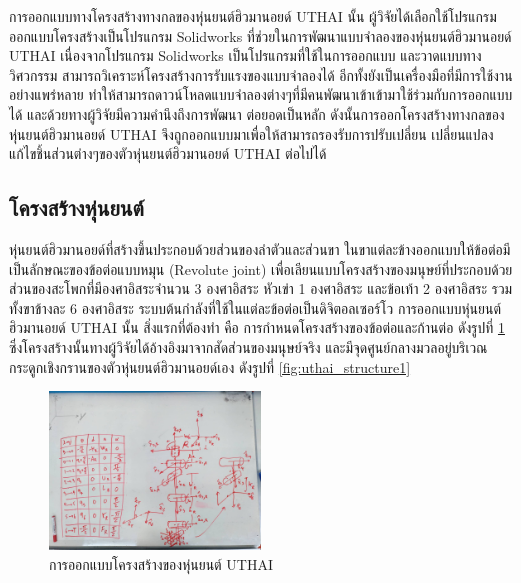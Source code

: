 การออกแบบทางโครงสร้างทางกลของหุ่นยนต์ฮิวมานอยด์ UTHAI นั้น ผู้วิจัยได้เลือกใช้โปรแกรมออกแบบโครงสร้างเป็นโปรแกรม Solidworks
ที่ช่วยในการพัฒนาแบบจำลองของหุ่นยนต์ฮิวมานอยด์ UTHAI
เนื่องจากโปรแกรม Solidworks เป็นโปรแกรมที่ใช้ในการออกแบบ และวาดแบบทางวิศวกรรม
สามารถวิเคราะห์โครงสร้างการรับแรงของแบบจำลองได้ อีกทั้งยังเป็นเครื่องมือที่มีการใช้งานอย่างแพร่หลาย
ทำให้สามารถดาวน์โหลดแบบจำลองต่างๆที่มีคนพัฒนาเข้าเข้ามาใช้ร่วมกับการออกแบบได้ 
และด้วยทางผู้วิจัยมีความคำนึงถึงการพัฒนา ต่อยอดเป็นหลัก ดังนั้นการออกโครงสร้างทางกลของหุ่นยนต์ฮิวมานอยด์ UTHAI
จึงถูกออกแบบมาเพื่อให้สามารถรองรับการปรับเปลี่ยน เปลี่ยนแปลง แก้ไขชิ้นส่วนต่างๆของตัวหุ่นยนต์ฮิวมานอยด์ UTHAI ต่อไปได้

\subsection{โครงสร้างหุ่นยนต์}
หุ่นยนต์ฮิวมานอยด์ที่สร้างขึ้นประกอบด้วยส่วนของลำตัวและส่วนขา ในขาแต่ละข้างออกแบบให้ข้อต่อมีเป็นลักษณะของข้อต่อแบบหมุน (Revolute joint)
เพื่อเลียนแบบโครงสร้างของมนุษย์ที่ประกอบด้วย ส่วนของสะโพกที่มีองศาอิสระจำนวน 3 องศาอิสระ หัวเข่า 1
องศาอิสระ และข้อเท้า 2 องศาอิสระ รวมทั้งขาข้างละ 6 องศาอิสระ ระบบต้นกำลังที่ใช้ในแต่ละข้อต่อเป็นดิจิตอลเซอร์โว
การออกแบบหุ่นยนต์ฮิวมานอยด์ UTHAI นั้น
สิ่งแรกที่ต้องทำ คือ การกำหนดโครงสร้างของข้อต่อและก้านต่อ ดังรูปที่ \ref{fig:uthai_design_structure}
ซึ่งโครงสร้างนั้นทางผู้วิจัยได้อ้างอิงมาจากสัดส่วนของมนุษย์จริง
และมีจุดศูนย์กลางมวลอยู่บริเวณกระดูกเชิงกรานของตัวหุ่นยนต์ฮิวมานอยด์เอง ดังรูปที่ \ref{fig:uthai_structure1}

\begin{figure}[!ht]
    \centering
    \includegraphics[width=0.5\textwidth]{chapter3/images/clean/uthai_design_structure.jpg}
    \caption{การออกแบบโครงสร้างของหุ่นยนต์ UTHAI}
    \label{fig:uthai_design_structure}
\end{figure}

